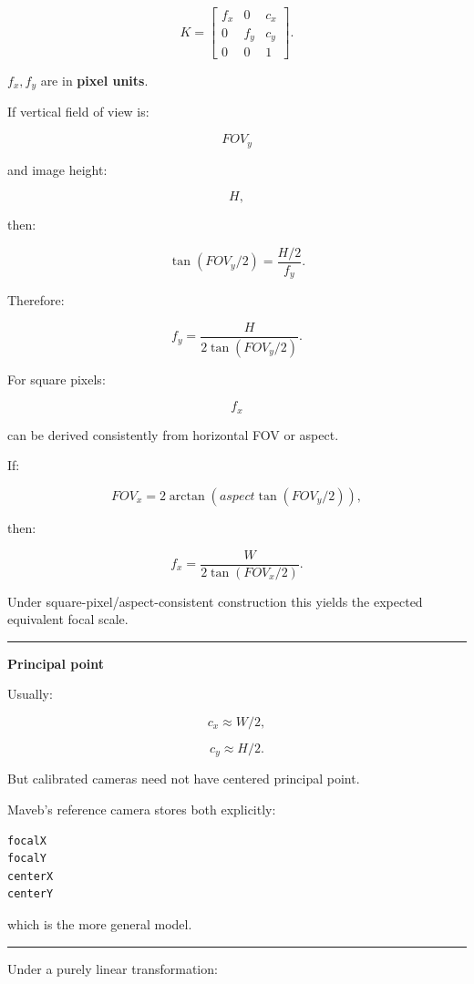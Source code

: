 \[
\boxed{
K=
\begin{bmatrix}
f_x&0&c_x\\
0&f_y&c_y\\
0&0&1
\end{bmatrix}.
}
\]

\(f_x,f_y\) are in \textbf{pixel units}.

If vertical field of view is:

\[
FOV_y
\]

and image height:

\[
H,
\]

then:

\[
\tan(FOV_y/2)
=
\frac{H/2}{f_y}.
\]

Therefore:

\[
\boxed{
f_y=
\frac{H}
{2\tan(FOV_y/2)}.
}
\]

For square pixels:

\[
f_x
\]

can be derived consistently from horizontal FOV or aspect.

If:

\[
FOV_x
=
2\arctan(
aspect\tan(FOV_y/2)
),
\]

then:

\[
f_x=
\frac{W}
{2\tan(FOV_x/2)}.
\]

Under square-pixel/aspect-consistent construction this yields the expected equivalent focal scale.

\begin{center}\rule{0.5\linewidth}{0.5pt}\end{center}

\textbf{Principal point}

Usually:

\[
c_x\approx W/2,
\]

\[
c_y\approx H/2.
\]

But calibrated cameras need not have centered principal point.

Maveb's reference camera stores both explicitly:

\protect{}\label{30s5gu}%
\begin{verbatim}
focalX
focalY
centerX
centerY
\end{verbatim}

which is the more general model.

\begin{center}\rule{0.5\linewidth}{0.5pt}\end{center}

Under a purely linear transformation:

